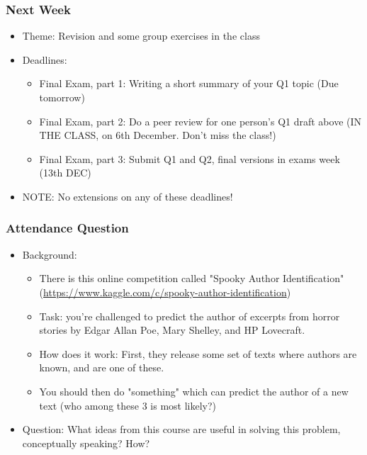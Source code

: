 \documentclass{beamer}
\begin{document}
\begin{frame}
\frametitle{Next Week}
\begin{itemize}
\item Theme: Revision and some group exercises in the class
\item Deadlines:
\begin{itemize}
\item Final Exam, part 1: Writing a short summary of your Q1 topic (Due tomorrow)
\item Final Exam, part 2: Do a peer review for one person's Q1 draft above (IN THE CLASS, on 6th December. Don't miss the class!)
\item Final Exam, part 3: Submit Q1 and Q2, final versions in exams week (13th DEC)
\end{itemize}
\item NOTE: No extensions on any of these deadlines!
\end{itemize}
\end{frame}

\begin{frame}
\frametitle{Attendance Question}
\begin{itemize}
\item Background:
\begin{itemize}
\item There is this online competition called "Spooky Author Identification" \\ (\url{https://www.kaggle.com/c/spooky-author-identification})
\item Task: you're challenged to predict the author of excerpts from horror stories by Edgar Allan Poe, Mary Shelley, and HP Lovecraft.
\item How does it work: First, they release some set of texts where authors are known, and are one of these.
\item You should then do "something" which can predict the author of a new text (who among these 3 is most likely?)
\end{itemize}
\item Question: What ideas from this course are useful in solving this problem, conceptually speaking? How?
\end{itemize}
\end{frame}
\end{document}
